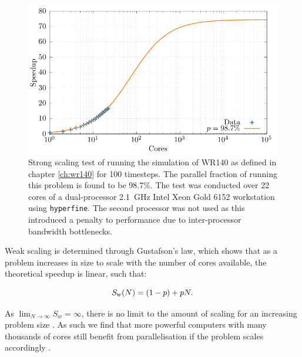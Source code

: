 \begin{figure}
  \centering
  \includegraphics{assets/athena-amdahl/amdahl.pdf}
  \caption[Strong scaling test of \athena]{Strong scaling test of \athena{} running the simulation of WR140 as defined in chapter \ref{ch:wr140} for 100 timesteps. The parallel fraction of \athena{} running this problem is found to be 98.7\%. The test was conducted over 22 cores of a dual-processor \SI{2.1}{\giga\hertz} Intel Xeon Gold 6152 workstation using \texttt{hyperfine}. The second processor was not used as this introduced a penalty to performance due to inter-processor bandwidth bottlenecks.}
  \label{fig:amdahl-athena}
\end{figure}

Weak scaling is determined through Gustafson's law, which shows that as a problem increases in size to scale with the number of cores available, the theoretical speedup is linear, such that:

\begin{equation}
  S_\text{w}(N) = (1-p) + pN.
\end{equation}

\noindent
As $\lim_{N\rightarrow\infty} S_w = \infty$, there is no limit to the amount of scaling for an increasing problem size \parencite{gustafsonReevaluatingAmdahlLaw1988}.
As such we find that more powerful computers with many thousands of cores still benefit from parallelisation if the problem scales accordingly \parencite[Ch.~2]{pachecoIntroductionParallelProgramming2022}.

